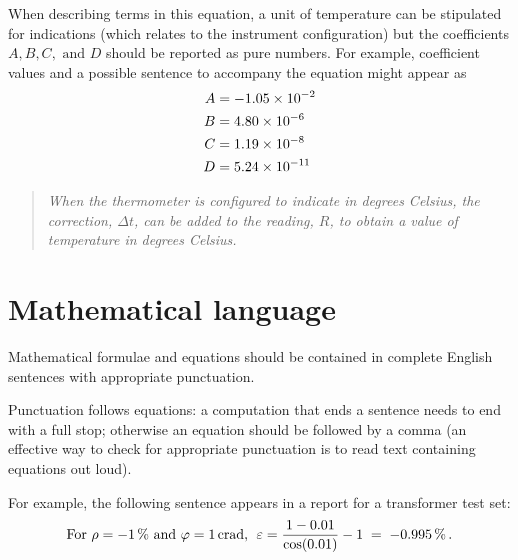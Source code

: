 {When describing terms in this equation, a unit of temperature can be stipulated for indications (which relates to the instrument configuration) but the coefficients $A, B, C,\text{ and }D$ should be reported as pure numbers. For example, coefficient values and a possible sentence to accompany the equation might appear as
\begin{align*}
    A &= \num{-1.05e-2}\\
    B &= \num{+4.80e-6}\\
    C &= \num{+1.19E-8}\\
    D &= \num{+5.24e-11} 
\end{align*}
\begin{quote}
\textit{When the thermometer is configured to indicate in degrees Celsius, the correction, $\Delta t$, can be added to the reading, $R$, to obtain a value of temperature in degrees Celsius. }
\end{quote}




}
\section{Mathematical language}
Mathematical formulae and equations should be contained in complete English sentences with appropriate punctuation. 

Punctuation follows equations: a computation that ends a sentence needs to end with a full stop; otherwise an equation should be followed by a comma (an effective way to check for appropriate punctuation is to read text containing equations out loud). 

For example, the following sentence appears in a report for a transformer test set: 
\[
\text{For $\rho = \SI{-1}{\%}$ and $\varphi= \SI{1}{crad}$,\; }
\varepsilon = \frac{1-0.01}{\cos(0.01)} - 1 \; =\; \SI{-0.995}{\%}\,. 
\]

